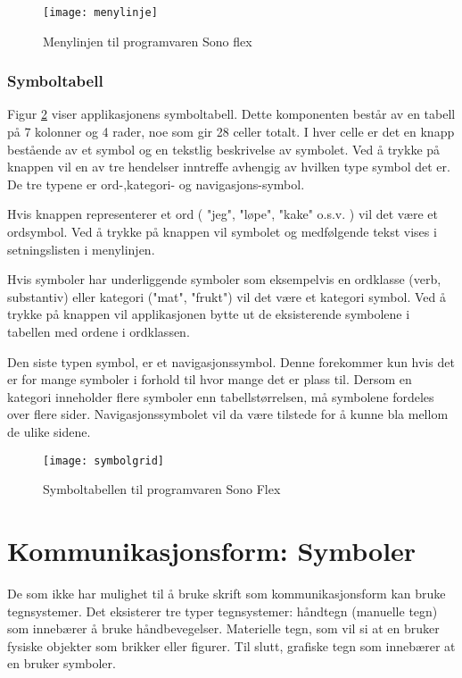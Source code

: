 \begin{figure}[ht!]
\centering
\texttt{[image: menylinje]}
\caption{Menylinjen til programvaren Sono flex}
\label{fig:menylinje}
\end{figure}


\subsubsection{Symboltabell}
\label{subsubsec:symboltabell}

Figur \ref{fig:symbolgrid} viser applikasjonens symboltabell. Dette komponenten består av en tabell på 7 kolonner og 4 rader, noe som gir 28 celler totalt. I hver celle er det en knapp bestående av et symbol og en tekstlig beskrivelse av symbolet. Ved å trykke på knappen vil en av tre hendelser inntreffe avhengig av hvilken type symbol det er. De tre typene er ord-,kategori- og navigasjons-symbol.

Hvis knappen representerer et ord ( "jeg",  "løpe",  "kake" o.s.v. ) vil det være et ordsymbol. Ved å trykke på knappen vil symbolet og medfølgende tekst vises i setningslisten i menylinjen.

Hvis symboler har underliggende symboler som eksempelvis en ordklasse (verb,  substantiv)  eller kategori ("mat",  "frukt") vil det være et kategori symbol. Ved å trykke på knappen vil applikasjonen bytte ut de eksisterende symbolene i tabellen med ordene i ordklassen. 

Den siste typen symbol, er et navigasjonssymbol. Denne forekommer kun hvis det er for mange symboler i forhold til hvor mange det er plass til. Dersom en kategori inneholder flere symboler enn tabellstørrelsen, må symbolene fordeles over flere sider. Navigasjonssymbolet vil da være tilstede for å kunne bla mellom de ulike sidene.


\begin{figure}[ht!]
\centering
\texttt{[image: symbolgrid]}
\caption{Symboltabellen til programvaren Sono Flex}
\label{fig:symbolgrid}
\end{figure}


\section{Kommunikasjonsform: Symboler}

De som ikke har mulighet til å bruke skrift som kommunikasjonsform kan bruke tegnsystemer. Det eksisterer tre typer tegnsystemer: håndtegn (manuelle tegn) som innebærer å bruke håndbevegelser. Materielle tegn, som vil si at en bruker fysiske objekter som brikker eller figurer. Til slutt, grafiske tegn som innebærer at en bruker symboler. 

